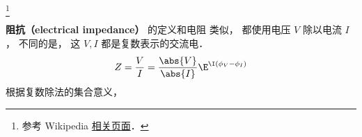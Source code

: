 
\begin{issues}
\issueDraft
\end{issues}


\footnote{参考 Wikipedia \href{https://en.wikipedia.org/wiki/Electrical_impedance}{相关页面}．}

\textbf{阻抗（electrical impedance）} 的定义和电阻 类似， 都使用电压 $V$ 除以电流 $I$， 不同的是， 这 $V, I$ 都是复数表示的交流电．
\begin{equation}
Z = \frac{V}{I} = \frac{\abs{V}}{\abs{I}} \E^{\I (\phi_V - \phi_I)}
\end{equation}
根据复数除法的集合意义， 
